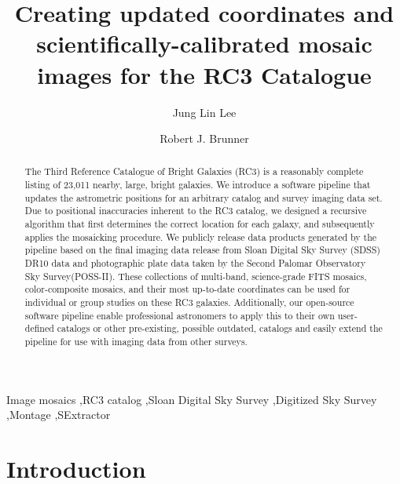 \documentclass[authoryear, 12pt, 5p, times]{elsarticle}
\begin{document}
\begin{frontmatter}
\title{Creating updated coordinates and scientifically-calibrated mosaic images for the RC3 Catalogue}
\author[ucb]{Jung Lin Lee}
\author[ui]{Robert J. Brunner}
\address[ucb]{Astronomy Department, University of California at Berkeley, Berkeley, CA 94720-3411} 
\address[ui]{Department of Astronomy, University of Illinois, Urbana, IL 61801}

\begin{abstract}
The Third Reference Catalogue of Bright Galaxies (RC3) is a reasonably complete listing of 23,011 nearby, large, bright galaxies. We introduce a software pipeline that updates the astrometric positions for an arbitrary catalog and survey imaging data set. Due to positional inaccuracies inherent to the RC3 catalog, we designed a recursive algorithm that first determines the correct location for each galaxy, and subsequently applies the mosaicking procedure.  We publicly release data products generated by the pipeline based on the final imaging data release from Sloan Digital Sky Survey (SDSS) DR10 data and photographic plate data taken by the Second Palomar Observatory Sky Survey(POSS-II). These collections of multi-band,  science-grade FITS mosaics,  color-composite mosaics, and their most up-to-date coordinates can be used for individual or group studies on these RC3 galaxies.  Additionally, our open-source software pipeline enable professional astronomers to apply this to their own user-defined catalogs or other pre-existing, possible outdated, catalogs and easily extend the pipeline for use with imaging data from other surveys. 
\end{abstract}

\begin{keyword}
Image mosaics \sep RC3 catalog \sep Sloan Digital Sky Survey \sep Digitized Sky Survey \sep Montage \sep SExtractor
\end{keyword}

\end{frontmatter}

\section{Introduction}
\end{document}
